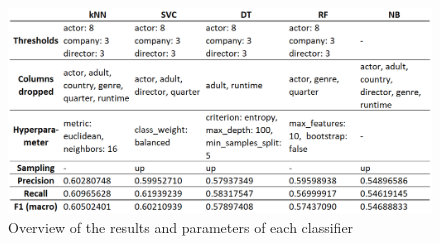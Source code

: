 \begin{figure}[h]
\includegraphics[width=\textwidth]{images/Classifier.png}
	\caption[Overview of the results and parameters of each classifier]{Overview of the results and parameters of each classifier\footnotemark}
\label{img:classifiers}
\end{figure}
\FloatBarrier
{}


